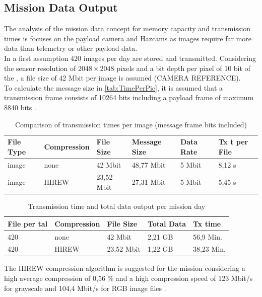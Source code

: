 \subsection{Mission Data Output}
\label{app:MissionDataOutput}

The analysis of the mission data concept for memory capacity and transmission times is focuses on the payload camera and Hazcams as images require far more data than telemetry or other payload data. \\

In a first assumption 420 images per day are stored and transmitted. Considering the sensor resolution of $2048\times2048$ pixels and a bit depth per pixel of 10 bit of the , a file size of 42 Mbit per image is assumed (CAMERA REFERENCE).\\
To calculate the message size in \autoref{tab:TimePerPic}, it is assumed that a transmission frame consists of 10264 bits including a payload frame of maximum 8840 bits \cite{FLP}.   

\begin{table}[h]
\centering
\begin{tabular}{llllll}
File Type & Compression    & File Size  & Message Size & Data Rate & Tx t per File \\ \hline\hline
image     & none           & 42 Mbit    & 48,77 Mbit   & 5 Mbit    & 8,12 s        \\
image     & HIREW          & 23,52 Mbit & 27,31 Mbit   & 5 Mbit    & 5,45 s        \\ \hline
\end{tabular}
\caption{Comparison of transmission times per image (message frame bits included)}
\label{tab:TimePerPic}
\end{table}

\begin{table}[h]
\centering
\begin{tabular}{lllll}
File per tal & Compression & File Size  & Total Data & Tx time    \\ \hline\hline
420          & none        & 42 Mbit    & 2,21 GB    & 56,9 Min.  \\
420          & HIREW       & 23,52 Mbit & 1,22 GB    & 38,23 Min. \\ \hline
\end{tabular}
\caption{Transmission time and total data output per mission day}
\label{tab:Tx-tptal}
\end{table}

The HIREW compression algorithm is suggested for the mission considering a high average compression of 0,56 \% and a high compression speed of 123 Mbit/s for grayscale and 104,4 Mbit/s for RGB image files \cite{HIREW}. 


